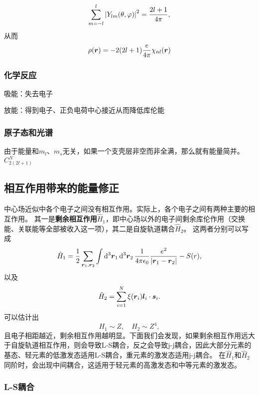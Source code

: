 \documentclass[UTF8, a4paper]{ctexart}
\begin{document}
\[
    \sum_{m=-l}^l \abs{Y_{lm}(\theta, \varphi)}^2 = \frac{2l+1}{4\pi},
\]
从而
\[
    \rho(\vb*{r}) = -2(2l+1) \frac{e}{4\pi} \chi_{nl}(\vb*{r})
\]

\subsubsection{化学反应}

吸能：失去电子

放能：得到电子、正负电荷中心接近从而降低库伦能

\subsubsection{原子态和光谱}

由于能量和$m_l$、$m_s$无关，如果一个支壳层非空而非全满，那么就有能量简并。$C_{2(2l+1)}^N$

\subsection{相互作用带来的能量修正}

中心场近似中各个电子之间没有相互作用。实际上，各个电子之间有两种主要的相互作用。
其一是\textbf{剩余相互作用}$\hat{H}_1$，即中心场以外的电子间剩余库伦作用（交换能、关联能等全部被收入这一项），其二是自旋轨道耦合$\hat{H}_2$。
这两者分别可以写成
\begin{equation}
    \hat{H}_1 = \frac{1}{2} \sum_{\vb*{r}_1, \vb*{r}_2} \int \dd[3]{\vb*{r}_1} \dd[3]{\vb*{r}_2} \frac{1}{4 \pi \epsilon_0} \frac{e^2}{\abs{\vb*{r}_1 - \vb*{r}_2}} - S(r),
\end{equation}
以及
\begin{equation}
    \hat{H}_2 = \sum_{i=1}^N \xi(\vb*{r}_i) \vb*{l}_i \cdot \vb*{s}_i.
    \label{eq:spin-orbital-many}
\end{equation}
可以估计出
\[
    H_1 \sim Z, \quad H_2 \sim Z^4,
\]
且电子相距越近，剩余相互作用越明显。下面我们会发现，如果剩余相互作用远大于自旋轨道相互作用，则会导致L-S耦合，反之会导致j-j耦合，因此大部分元素的基态、轻元素的低激发态适用L-S耦合，重元素的激发态适用j-j耦合。
在$\hat{H}_1$和$\hat{H}_2$同阶时，会出现中间耦合，这适用于轻元素的高激发态和中等元素的激发态。

\subsubsection{L-S耦合}
\end{document}
